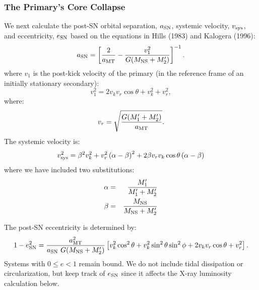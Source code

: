 \documentclass[12pt, preprint]{aastex}
\begin{document}
\subsubsection{The Primary's Core Collapse} \label{sec:trans_SN}

We next calculate the post-SN orbital separation, $a_{\rm SN}$, systemic velocity, $v_{\rm sys}$, and eccentricity, $e_{\rm SN}$ based on the equations in Hills (1983) and Kalogera (1996):
\begin{equation}
a_{\rm SN} = \left[ \frac{2 }{a_{\rm MT}}  - \frac{v_1^2}{G(M_{\rm NS} + M_2')} \right]^{-1}. \label{eq:SN_A} \\
\end{equation}
where $v_1$ is the post-kick velocity of the primary (in the reference frame of an initially stationary secondary):
\begin{equation}
v_1^2 = 2v_k v_r \cos \theta + v_k^2 + v_r^2, \label{eq:v_1}
\end{equation}
where:
\begin{equation}
v_r = \sqrt{\frac{G (M_1' + M_2')}{a_{\rm MT}}}. \label{eq:v_r}
\end{equation}
The systemic velocity is:
\begin{equation}
v_{\rm sys}^2 = \beta^2 v_k^2
   + v_r^2 \left( \alpha - \beta \right)^2
   + 2 \beta v_r v_k \cos \theta \left( \alpha - \beta \right)
    \label{eq:SN_v_sys}
\end{equation}
where we have included two substitutions:
\begin{eqnarray}
\alpha &=& \frac{M_1'}{M_1' + M_2'} \\
\beta &=& \frac{M_{\rm NS}}{M_{\rm NS} + M_2'}
\end{eqnarray}


The post-SN eccentricity is determined by:
\begin{equation}
1-e_{\rm SN}^2 = \frac{a_{\rm MT}^2}{a_{\rm SN}\ G (M_{\rm NS} + M_2')} \left[ v_k^2 \cos^2\theta + v_k^2 \sin^2 \theta \sin^2 \phi + 2 v_k v_r \cos \theta + v_r^2  \right]. \label{eq:SN_e}
\end{equation}
Systems with $0 \leq e < 1$ remain bound. We do not include tidal dissipation or circularization, but keep track of $e_{\rm SN}$ since it affects the X-ray luminosity calculation below.
\end{document}
